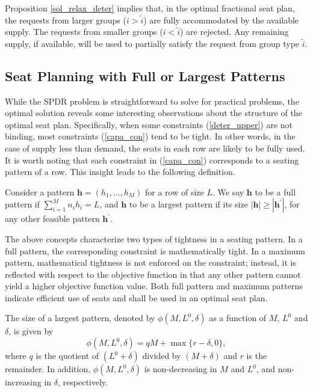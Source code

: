 Proposition \ref{sol_relax_deter} implies that, in the optimal fractional seat plan, the requests from larger groups ($i > \tilde{i}$) are fully accommodated by the available supply. The requests from smaller groups ($i < \tilde{i}$) are rejected. Any remaining supply, if available, will be used to partially satisfy the request from group type $\tilde{i}$. 

\subsection{Seat Planning with Full or Largest Patterns}\label{seat_planning_full_largest}
While the SPDR problem is straightforward to solve for practical problems, the optimal solution reveals some interesting observations about the structure of the optimal seat plan. Specifically, when some constraints (\ref{deter_upper}) are not binding, most constraints (\ref{capa_con}) tend to be tight. In other words, in the case of supply less than demand, the seats in each row are likely to be fully used. It is worth noting that each constraint in (\ref{capa_con}) corresponds to a seating pattern of a row.
This insight leads to the following definition.

\begin{definition}
Consider a pattern $\bm{h} = (h_1, \ldots, h_M)$ for a row of size $L$. We say $\bm{h}$ to be a full pattern if $\sum_{i=1}^{M} n_i h_i = L$, and $\bm{h}$ to be a largest pattern if its size $|\bm{h}| \geq |\bm{h}^{\prime}|$, for any other feasible pattern $\bm{h}^{\prime}$.
\end{definition}

The above concepts characterize two types of tightness in a seating pattern. In a full pattern, the corresponding constraint is mathematically tight. In a maximum pattern, mathematical tightness is not enforced on the constraint; instead, it is reflected with respect to the objective function in that any other pattern cannot yield a higher objective function value. Both full pattern and maximum patterns indicate efficient  use of seats and shall be used in an optimal seat plan.


\begin{prop}\label{lem_pattern}
The size of a largest pattern, denoted by $\phi(M, L^{0}, \delta)$ as a function of $M$, $L^{0}$ and $\delta$, is given by $$\phi(M, L^{0}, \delta) = q M + \max\{r-\delta, 0\},$$ where $q$ is the quotient of $(L^{0} + \delta)$ divided by $(M+\delta)$ and $r$ is the remainder. In addition, $\phi(M, L^{0}, \delta)$ is non-decreasing in $M$ and $L^{0}$, and non-increasing in $\delta$, respectively. 
\end{prop}

